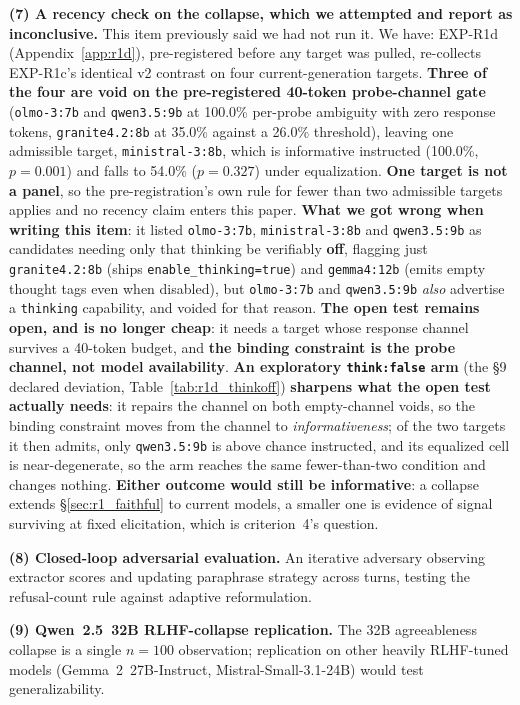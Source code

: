 \textbf{(7) A recency check on the collapse, which we attempted and report as inconclusive.} This item previously said we had not run it. We have: EXP-R1d (Appendix~\ref{app:r1d}), pre-registered before any target was pulled, re-collects EXP-R1c's identical v2 contrast on four current-generation targets. \textbf{Three of the four are void on the pre-registered 40-token probe-channel gate} (\texttt{olmo-3:7b} and \texttt{qwen3.5:9b} at 100.0\% per-probe ambiguity with zero response tokens, \texttt{granite4.2:8b} at 35.0\% against a 26.0\% threshold), leaving one admissible target, \texttt{ministral-3:8b}, which is informative instructed (100.0\%, $p=0.001$) and falls to 54.0\% ($p=0.327$) under equalization. \textbf{One target is not a panel}, so the pre-registration's own rule for fewer than two admissible targets applies and no recency claim enters this paper. \textbf{What we got wrong when writing this item}: it listed \texttt{olmo-3:7b}, \texttt{ministral-3:8b} and \texttt{qwen3.5:9b} as candidates needing only that thinking be verifiably \textbf{off}, flagging just \texttt{granite4.2:8b} (ships \texttt{enable\_thinking=true}) and \texttt{gemma4:12b} (emits empty thought tags even when disabled), but \texttt{olmo-3:7b} and \texttt{qwen3.5:9b} \emph{also} advertise a \texttt{thinking} capability, and voided for that reason. \textbf{The open test remains open, and is no longer cheap}: it needs a target whose response channel survives a 40-token budget, and \textbf{the binding constraint is the probe channel, not model availability}. \textbf{An exploratory \texttt{think:false} arm} (the §9 declared deviation, Table~\ref{tab:r1d_thinkoff}) \textbf{sharpens what the open test actually needs}: it repairs the channel on both empty-channel voids, so the binding constraint moves from the channel to \emph{informativeness}; of the two targets it then admits, only \texttt{qwen3.5:9b} is above chance instructed, and its equalized cell is near-degenerate, so the arm reaches the same fewer-than-two condition and changes nothing. \textbf{Either outcome would still be informative}: a collapse extends §\ref{sec:r1_faithful} to current models, a smaller one is evidence of signal surviving at fixed elicitation, which is criterion~4's question.

\textbf{(8) Closed-loop adversarial evaluation.} An iterative adversary observing extractor scores and updating paraphrase strategy across turns, testing the refusal-count rule against adaptive reformulation.

\textbf{(9) Qwen~2.5~32B RLHF-collapse replication.} The 32B agreeableness collapse is a single $n=100$ observation; replication on other heavily RLHF-tuned models (Gemma~2~27B-Instruct, Mistral-Small-3.1-24B) would test generalizability.


